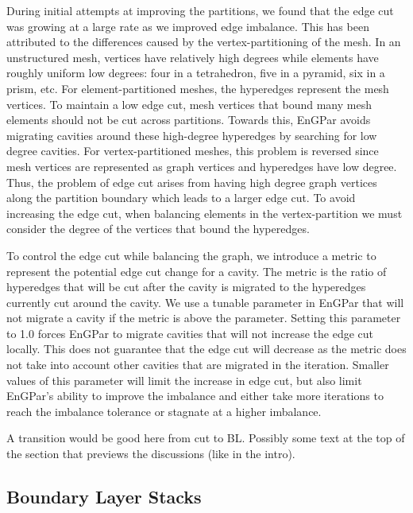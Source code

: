 \documentclass[conference]{IEEEtran}
\begin{document}

During initial attempts at improving the partitions, we found that the edge cut was growing
at a large rate as we improved edge imbalance. This has been attributed to the differences
caused by the vertex-partitioning of the mesh. In an unstructured mesh, vertices have
relatively high degrees while elements have roughly uniform low degrees: four in a tetrahedron, five in a pyramid, six in a prism, etc. For element-partitioned meshes, the hyperedges
represent the mesh vertices. To maintain a low edge cut, mesh vertices that bound many mesh
elements should not be cut across partitions. Towards this, EnGPar avoids migrating cavities
around these high-degree hyperedges by searching for low degree cavities. For vertex-partitioned
meshes, this problem is reversed since mesh vertices are represented as graph vertices
and hyperedges have low degree.
Thus, the problem of edge cut arises from having high degree graph vertices along the partition
boundary which leads to a larger edge cut. To avoid increasing the edge cut, when balancing
elements in the vertex-partition we must consider the degree of the vertices that bound the
hyperedges.

To control the edge cut while balancing the graph, we introduce a metric to represent the
potential edge cut change for a cavity. The metric is the ratio of hyperedges that will be cut
after the cavity is migrated to the hyperedges currently cut around the cavity. We use a tunable
parameter in EnGPar that will not migrate a cavity if the metric is above the parameter.
Setting this parameter to 1.0 forces EnGPar to migrate cavities that will not increase the edge
cut locally. This does not guarantee that the edge cut will decrease as the metric does not take
into account other cavities that are migrated in the iteration. Smaller values of this
parameter will limit the increase in edge cut, but also limit EnGPar's ability to improve the
imbalance and either take more iterations to reach the imbalance tolerance or stagnate at a
higher imbalance.

{\color{red} A transition would be good here from cut to BL. Possibly some text
at the top of the section that previews the discussions (like in the intro).}

\subsection{Boundary Layer Stacks}
\end{document}
